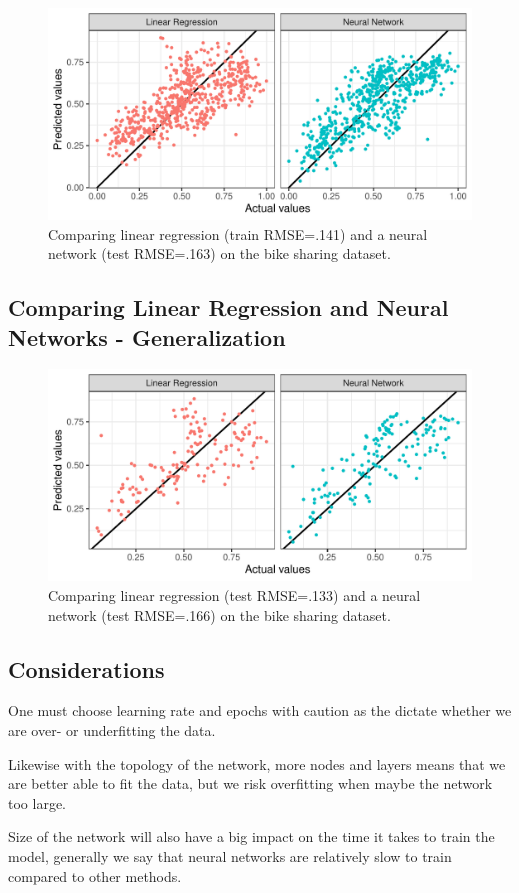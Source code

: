\documentclass[aspectratio=169,10pt]{beamer}
\begin{document}
\begin{frame}{\secname}{\subsecname}
  \begin{figure}
    \includegraphics[width=.7\textwidth]{scripts/output/neural_network_compare_train.pdf}
    \caption{Comparing linear regression (train RMSE=.141) and a neural network (test RMSE=.163) on the bike sharing dataset.}
  \end{figure}
\end{frame}

\subsection{Comparing Linear Regression and Neural Networks - Generalization}

\begin{frame}{\secname}{\subsecname}
  \begin{figure}
    \includegraphics[width=.7\textwidth]{scripts/output/neural_network_compare.pdf}
    \caption{Comparing linear regression (test RMSE=.133) and a neural network (test RMSE=.166) on the bike sharing dataset.}
  \end{figure}
\end{frame}

\subsection{Considerations}
\begin{frame}{\secname}{\subsecname}
  One must choose learning rate and epochs with caution as the dictate whether we are over- or underfitting the data.

  Likewise with the topology of the network, more nodes and layers means that we are better able to fit the data, but we risk overfitting when maybe the network too large.

  Size of the network will also have a big impact on the time it takes to train the model, generally we say that neural networks are relatively slow to train compared to other methods.
\end{frame}

{\aauwavesbg
\begin{frame}
\end{frame}}
\end{document}
